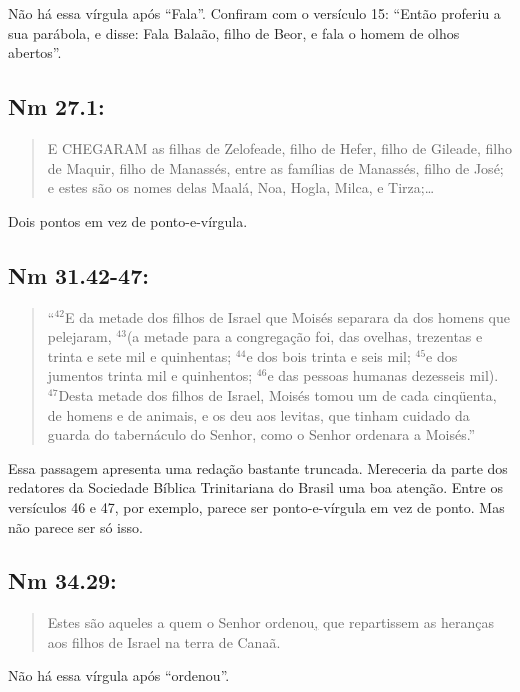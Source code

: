 Não há essa vírgula após ``Fala''. Confiram com o versículo 15: ``Então
proferiu a sua parábola, e disse: Fala Balaão, filho de Beor, e fala o
homem de olhos abertos''.

\subsection*{Nm 27.1:} 
\begin{quote}
    \small
E CHEGARAM as filhas de Zelofeade, filho de Hefer, filho de Gileade, filho de Maquir, filho de Manassés, entre as famílias de Manassés, filho de José; e estes são os nomes delas\uwave{;} Maalá, Noa, Hogla, Milca, e Tirza;\ldots
\end{quote}

Dois pontos em vez de ponto-e-vírgula.

\subsection*{Nm 31.42-47:} 
\begin{quote}
    \small
``$^{\mathrm{42}}$E da metade dos filhos de Israel que Moisés separara
da dos homens que pelejaram, $^{\mathrm{43}}$(a metade para a congregação foi, das ovelhas, trezentas e trinta e sete mil e quinhentas; $^{\mathrm{44}}$e dos bois trinta e seis mil; $^{\mathrm{45}}$e dos jumentos trinta mil e quinhentos;
$^{\mathrm{46}}$e das pessoas humanas dezesseis mil). $^{\mathrm{47}}$Desta metade dos filhos de Israel, Moisés tomou um de cada cinqüenta, de homens e de animais, e os deu aos levitas, que tinham cuidado da guarda do tabernáculo do Senhor, como o Senhor ordenara a Moisés.''
\end{quote}

Essa passagem apresenta uma redação bastante truncada. Mereceria da
parte dos redatores da Sociedade Bíblica Trinitariana do Brasil uma
boa atenção. Entre os versículos 46 e 47, por exemplo, parece ser
ponto-e-vírgula em vez de ponto. Mas não parece ser só isso.

\subsection*{Nm 34.29:} 
\begin{quote}
    \small
Estes são aqueles a quem o Senhor ordenou\uline{,} que repartissem as heranças aos filhos de Israel na terra de Canaã.
\end{quote}
Não há essa vírgula após ``ordenou''.


